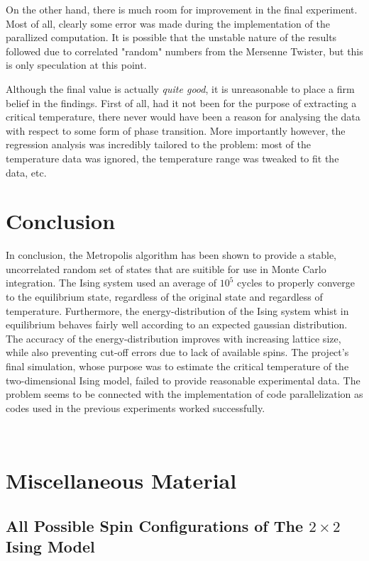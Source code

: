 \documentclass[nofootinbib,reprint,english]{revtex4-1}
\begin{document}
On the other hand, there is much room for improvement in the final experiment. Most of all, clearly some error was made during the implementation of the parallized computation. It is possible that the unstable nature of the results followed due to correlated "random" numbers from the Mersenne Twister, but this is only speculation at this point.

Although the final value is actually \emph{quite good}, it is unreasonable to place a firm belief in the findings. First of all, had it not been for the purpose of extracting a critical temperature, there never would have been a reason for analysing the data with respect to some form of phase transition. More importantly however, the regression analysis was incredibly tailored to the problem: most of the temperature data was ignored, the temperature range was tweaked to fit the data, etc.

\section{Conclusion}
In conclusion, the Metropolis algorithm has been shown to provide a stable, uncorrelated random set of states that are suitible for use in Monte Carlo integration. The Ising system used an average of \(10^5\) cycles to properly converge to the equilibrium state, regardless of the original state and regardless of temperature. Furthermore, the energy-distribution of the Ising system whist in equilibrium behaves fairly well according to an expected gaussian distribution. The accuracy of the energy-distribution improves with increasing lattice size, while also preventing cut-off errors due to lack of available spins. The project's final simulation, whose purpose was to estimate the critical temperature of the two-dimensional Ising model, failed to provide reasonable experimental data. The problem seems to be connected with the implementation of code parallelization as codes used in the previous experiments worked successfully.







~
\clearpage
\appendix

\onecolumngrid
\section{Miscellaneous Material}\label{app:additional_material}
\subsection{All Possible Spin Configurations of The \(2\times2\) Ising Model}
\end{document}
